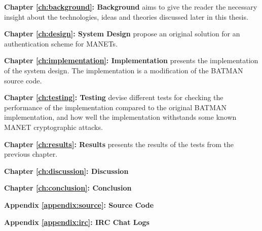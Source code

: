 \textbf{Chapter \ref{ch:background}: Background} aims to give the reader the
necessary insight about the technologies, ideas and theories discussed later in
this thesis.

\textbf{Chapter \ref{ch:design}: System Design} propose an original solution
for an authentication scheme for \acp{MANET}.

\textbf{Chapter \ref{ch:implementation}: Implementation} presents the
implementation of the system design. The implementation is a modification of the
\ac{BATMAN} source code.

\textbf{Chapter \ref{ch:testing}: Testing} devise different tests for checking
the performance of the implementation compared to the original \ac{BATMAN}
implementation, and how well the implementation withstands some known \ac{MANET}
cryptographic attacks.

\textbf{Chapter \ref{ch:results}: Results} presents the results of the tests
from the previous chapter.

\textbf{Chapter \ref{ch:discussion}: Discussion}

\textbf{Chapter \ref{ch:conclusion}: Conclusion}

\textbf{Appendix \ref{appendix:source}: Source Code}

\textbf{Appendix \ref{appendix:irc}: IRC Chat Logs}